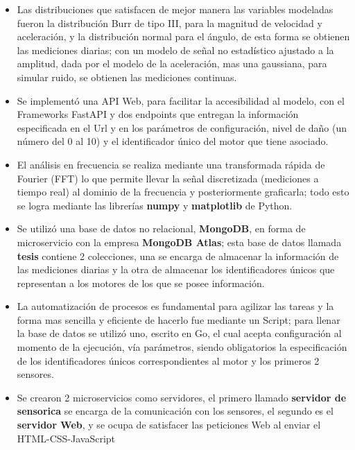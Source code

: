 \begin{itemize}
    \item Las distribuciones que satisfacen de mejor manera las variables
        modeladas fueron la distribución Burr
        de tipo III, para la magnitud de velocidad y aceleración, y la distribución
        normal para el ángulo, de esta forma se obtienen las mediciones diarias;
        con un modelo de señal no estadístico ajustado a la amplitud, dada por
        el modelo de la aceleración, mas una gaussiana, para simular ruido, se obtienen
        las mediciones continuas.
    \item Se implementó una API Web, para facilitar la accesibilidad al modelo, con
        el Frameworks FastAPI y dos endpoints que entregan la información especificada
        en el Url y en los parámetros de configuración, nivel de daño (un número del 0 al 10)
        y el identificador único del motor que tiene asociado.
    \item El análisis en frecuencia se realiza mediante una
        transformada rápida de Fourier (FFT) lo que permite llevar la señal
        discretizada (mediciones a tiempo real) al dominio de la frecuencia
        y posteriormente graficarla; todo esto se logra mediante las librerías
        \textbf{numpy} y \textbf{matplotlib} de Python.
    \item  Se utilizó una base de datos no relacional, \textbf{MongoDB}, en forma
        de microservicio con la empresa \textbf{MongoDB Atlas};
        esta base de datos llamada \textbf{tesis}
        contiene 2 colecciones, una se encarga de almacenar la información de las
        mediciones diarias y la otra de almacenar los identificadores únicos que
        representan a los motores de los que se posee información.
    \item La automatización de procesos es fundamental para agilizar las tareas y
        la forma mas sencilla y eficiente de hacerlo fue mediante un Script; para
        llenar la base de datos se utilizó uno, escrito en Go, el cual acepta
        configuración al momento de la ejecución, vía parámetros, siendo obligatorios
        la especificación de los identificadores únicos correspondientes al motor
        y los primeros 2 sensores.
    \item Se crearon 2 microservicios como servidores, el primero llamado
        \textbf{servidor de sensorica}
        se encarga de la comunicación con los sensores, el segundo es el \textbf{servidor Web},
        y se ocupa de satisfacer las peticiones Web al enviar el HTML-CSS-JavaScript

\end{itemize}
